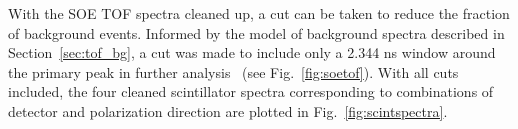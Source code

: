 With the SOE TOF spectra cleaned up, a cut can be taken to reduce the fraction of background events.  Informed by the model of background spectra described in Section~\ref{sec:tof_bg}, a cut was made to include only a 2.344 ns window around the primary peak in further analysis~ (see Fig.~\ref{fig:soetof}).  With all cuts included, the four cleaned scintillator spectra corresponding to combinations of detector and polarization direction are plotted in Fig.~\ref{fig:scintspectra}.








